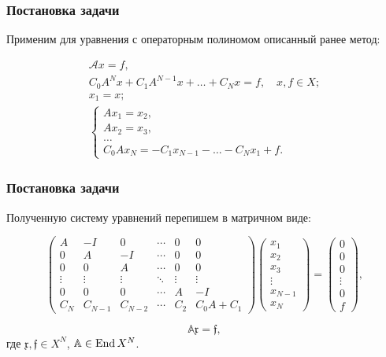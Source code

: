 \documentclass{beamer}
\begin{document}
\begin{frame}
\frametitle{Постановка задачи}

Применим для уравнения с операторным полиномом описанный ранее метод:

\begin{gather*}
    \mathcal{A}x = f, \\
    C_0 A^N x + C_1 A^{N-1} x + \dotsc + C_N x = f, \quad x, f \in X; \\[2em]
    x_1 = x; \\
    \left\{ \begin{gathered}
        A x_1 = x_2, \\
        A x_2 = x_3, \\
        \dotsc \\
        C_0 A x_N = -C_1 x_{N-1} - \dotsc - C_N x_1 + f.
    \end{gathered}\right.
\end{gather*}

\end{frame}

\begin{frame}
\frametitle{Постановка задачи}

Полученную систему уравнений перепишем в матричном виде:

\[ \begin{pmatrix}
    A & -I & 0  & \cdots & 0 & 0 \\
    0 & A  & -I & \cdots & 0 & 0 \\
    0 & 0  & A & \cdots & 0 & 0 \\
    \vdots & \vdots & \vdots & \ddots & \vdots & \vdots \\
    0 & 0 & 0 & \cdots & A & -I \\
    C_N & C_{N-1} & C_{N-2} & \cdots & C_2 & C_0 A + C_1
   \end{pmatrix} \begin{pmatrix}
    x_1 \\
    x_2 \\
    x_3 \\
    \vdots \\
    x_{N - 1} \\
    x_{N}
   \end{pmatrix} = \begin{pmatrix}
    0 \\
    0 \\
    0 \\
    \vdots \\
    0 \\
    f
   \end{pmatrix}, \]

\[ \mathbb{A} \mathfrak{x} = \mathfrak{f}, \]
где $\mathfrak{x}, \mathfrak{f} \in X^N$, $\mathbb{A} \in \operatorname{End}{X^N}$.
\end{frame}
\end{document}
